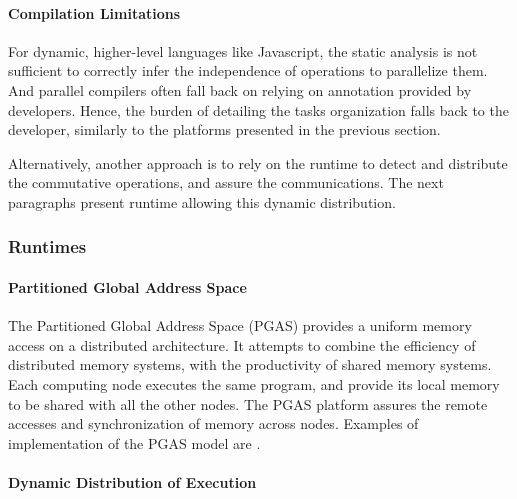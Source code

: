 

\paragraph{Compilation Limitations}

For dynamic, higher-level languages like Javascript, the static analysis is not sufficient to correctly infer the independence of operations to parallelize them.
And parallel compilers often fall back on relying on annotation provided by developers.
Hence, the burden of detailing the tasks organization falls back to the developer, similarly to the platforms presented in the previous section.

Alternatively, another approach is to rely on the runtime to detect and distribute the commutative operations, and assure the communications.
The next paragraphs present runtime allowing this dynamic distribution.

\subsubsection{Runtimes} \label{chapter3:software-adoption:runtimes}

\paragraph{Partitioned Global Address Space}

The Partitioned Global Address Space (PGAS) provides a uniform memory access on a distributed architecture.
It attempts to combine the efficiency of distributed memory systems, with the productivity of shared memory systems.
Each computing node executes the same program, and provide its local memory to be shared with all the other nodes.
The PGAS platform assures the remote accesses and synchronization of memory across nodes.
Examples of implementation of the PGAS model are .

\paragraph{Dynamic Distribution of Execution}

